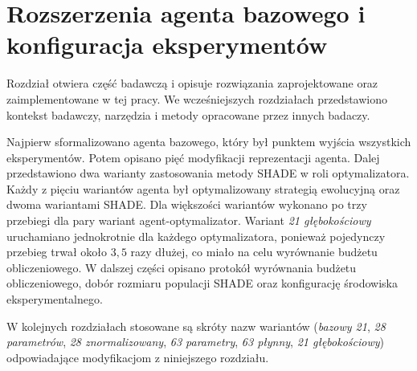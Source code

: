 \chapter{Rozszerzenia agenta bazowego i konfiguracja eksperymentów} \label{chap:modifications}

Rozdział otwiera część badawczą i opisuje rozwiązania zaprojektowane oraz zaimplementowane w tej pracy. We wcześniejszych rozdziałach przedstawiono kontekst badawczy, narzędzia i metody opracowane przez innych badaczy.

Najpierw sformalizowano agenta bazowego, który był punktem wyjścia wszystkich eksperymentów. Potem opisano pięć modyfikacji reprezentacji agenta. Dalej przedstawiono dwa warianty zastosowania metody SHADE w roli optymalizatora. Każdy z pięciu wariantów agenta był optymalizowany strategią ewolucyjną oraz dwoma wariantami SHADE. Dla większości wariantów wykonano po trzy przebiegi dla pary wariant agent-optymalizator. Wariant \textit{21 głębokościowy} uruchamiano jednokrotnie dla każdego optymalizatora, ponieważ pojedynczy przebieg trwał około \(3{,}5\) razy dłużej, co miało na celu wyrównanie budżetu obliczeniowego. W dalszej części opisano protokół wyrównania budżetu obliczeniowego, dobór rozmiaru populacji SHADE oraz konfigurację środowiska eksperymentalnego.

W kolejnych rozdziałach stosowane są skróty nazw wariantów (\textit{bazowy 21}, \textit{28 parametrów}, \textit{28 znormalizowany}, \textit{63 parametry}, \textit{63 płynny}, \textit{21 głębokościowy}) odpowiadające modyfikacjom z niniejszego rozdziału.








